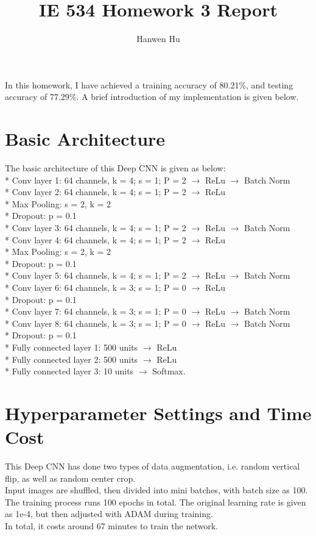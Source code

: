 \documentclass[12pt]{article}
\title{IE 534 Homework 3 Report}
\author{Hanwen Hu}
\begin{document}
In this homework, I have achieved a training accuracy of 80.21\%, and testing accuracy of 77.29\%. A brief introduction of my implementation is given below.\\

\section{Basic Architecture}
The basic architecture of this Deep CNN is given as below:\\
* Conv layer 1: 64 channels, k = 4; s = 1; P = 2 $\rightarrow$ ReLu $\rightarrow$ Batch Norm\\
* Conv layer 2: 64 channels, k = 4; s = 1; P = 2 $\rightarrow$ ReLu\\
* Max Pooling: s = 2, k = 2\\
* Dropout: p = 0.1\\
* Conv layer 3: 64 channels, k = 4; s = 1; P = 2 $\rightarrow$ ReLu $\rightarrow$ Batch Norm\\
* Conv layer 4: 64 channels, k = 4; s = 1; P = 2 $\rightarrow$ ReLu\\
* Max Pooling: s = 2, k = 2\\
* Dropout: p = 0.1\\
* Conv layer 5: 64 channels, k = 4; s = 1; P = 2 $\rightarrow$ ReLu $\rightarrow$ Batch Norm\\
* Conv layer 6: 64 channels, k = 3; s = 1; P = 0 $\rightarrow$ ReLu\\
* Dropout: p = 0.1\\
* Conv layer 7: 64 channels, k = 3; s = 1; P = 0 $\rightarrow$ ReLu $\rightarrow$ Batch Norm\\
* Conv layer 8: 64 channels, k = 3; s = 1; P = 0 $\rightarrow$ ReLu $\rightarrow$ Batch Norm\\
* Dropout: p = 0.1\\
* Fully connected layer 1: 500 units $\rightarrow$ ReLu\\
* Fully connected layer 2: 500 units $\rightarrow$ ReLu\\
* Fully connected layer 3: 10 units $\rightarrow$ Softmax.

\section{Hyperparameter Settings and Time Cost}
This Deep CNN has done two types of data augmentation, i.e. random vertical flip, as well as random center crop.\\
Input images are shuffled, then divided into mini batches, with batch size as 100.\\
The training process runs 100 epochs in total. The original learning rate is given as 1e-4, but then adjusted with ADAM during training.\\
In total, it costs around 67 minutes to train the network.
\end{document}
